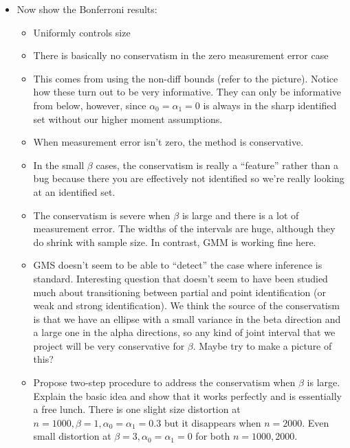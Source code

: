 \begin{itemize}
  \item Now show the Bonferroni results:
    \begin{itemize}
      \item Uniformly controls size
      \item There is basically no conservatism in the zero measurement error case
      \item This comes from using the non-diff bounds (refer to the picture). Notice how these turn out to be very informative. They can only be informative from below, however, since $\alpha_0 = \alpha_1 = 0$ is always in the sharp identified set without our higher moment assumptions.
      \item When measurement error isn't zero, the method is conservative. 
      \item In the small $\beta$ cases, the conservatism is really a ``feature'' rather than a bug because there you are effectively not identified so we're really looking at an identified set.
      \item The conservatism is severe when $\beta$ is large and there is a lot of measurement error.
        The widths of the intervals are huge, although they do shrink with sample size.
        In contrast, GMM is working fine here.
      \item GMS doesn't seem to be able to ``detect'' the case where inference is standard. 
        Interesting question that doesn't seem to have been studied much about transitioning between partial and point identification (or weak and strong identification).
        We think the source of the conservatism is that we have an ellipse with a small variance in the beta direction and a large one in the alpha directions, so any kind of joint interval that we project will be very conservative for $\beta$. Maybe try to make a picture of this?
      \item Propose two-step procedure to address the conservatism when $\beta$ is large. 
        Explain the basic idea and show that it works perfectly and is essentially a free lunch. 
        There is one slight size distortion at $n = 1000,\beta = 1, \alpha_0 = \alpha_1 = 0.3$ but it disappears when $n = 2000$. Even small distortion at $\beta = 3, \alpha_0 = \alpha_1 = 0$ for both $n =1000, 2000$.
    \end{itemize}
\end{itemize}
